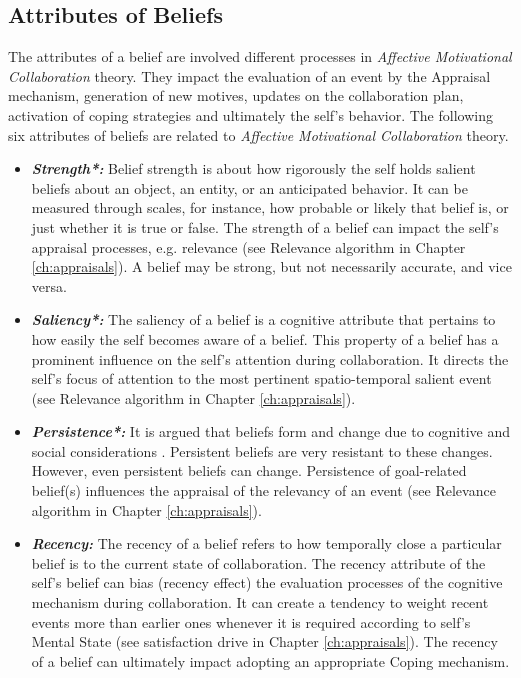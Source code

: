 \documentclass[12pt]{report}
\begin{document}
\subsection{Attributes of Beliefs}

The attributes of a belief are involved different processes in \textit{Affective
Motivational Collaboration} theory. They impact the evaluation of an event by
the Appraisal mechanism, generation of new motives, updates on the collaboration
plan, activation of coping strategies and ultimately the self's behavior. The
following six attributes of beliefs are related to \textit{Affective
Motivational Collaboration} theory.

\begin{itemize}
  \item \textbf{\textit{Strength*:}} Belief strength is about how rigorously
  the self holds salient beliefs about an object, an entity, or an anticipated
  behavior. It can be measured through scales, for instance, how probable or
  likely that belief is, or just whether it is true or false. The strength of a
  belief can impact the self's appraisal processes, e.g. relevance (see
  Relevance algorithm in Chapter \ref{ch:appraisals}). A belief may be strong,
  but not necessarily accurate, and vice versa.
  
  \item \textbf{\textit{Saliency*:}} The saliency of a belief is a cognitive
  attribute that pertains to how easily the self becomes aware of a belief.
  This property of a belief has a prominent influence on the self's attention
  during collaboration. It directs the self's focus of attention to the most
  pertinent spatio-temporal salient event (see Relevance algorithm in Chapter
  \ref{ch:appraisals}).
  
  \item \textbf{\textit{Persistence*:}} It is argued that beliefs form and
  change due to cognitive and social considerations
  \cite{carley:belief-persistence}. Persistent beliefs are very resistant to
  these changes. However, even persistent beliefs can change. Persistence of
  goal-related belief(s) influences the appraisal of the relevancy of an event
  (see Relevance algorithm in Chapter \ref{ch:appraisals}).
  
  \item \textbf{\textit{Recency:}} The recency of a belief refers to how
  temporally close a particular belief is to the current state of collaboration.
  The recency attribute of the self's belief can bias (recency effect) the
  evaluation processes of the cognitive mechanism during collaboration. It can
  create a tendency to weight recent events more than earlier ones whenever it
  is required according to self's Mental State (see satisfaction drive in
  Chapter \ref{ch:appraisals}). The recency of a belief can ultimately impact
  adopting an appropriate Coping mechanism.
  

\end{itemize}
\end{document}
